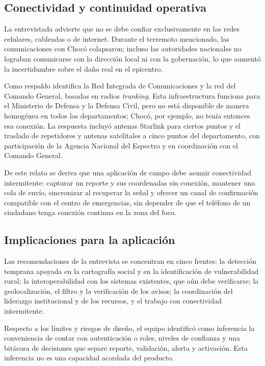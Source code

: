 \subsection{Conectividad y continuidad operativa}

La entrevistada advierte que no se debe confiar exclusivamente en las redes celulares, cableadas o de internet. Durante el terremoto mencionado, las comunicaciones con Chocó colapsaron; incluso las autoridades nacionales no lograban comunicarse con la dirección local ni con la gobernación, lo que aumentó la incertidumbre sobre el daño real en el epicentro.

Como respaldo identifica la Red Integrada de Comunicaciones y la red del Comando General, basadas en radios \emph{trunking}. Esta infraestructura funciona para el Ministerio de Defensa y la Defensa Civil, pero no está disponible de manera homogénea en todos los departamentos; Chocó, por ejemplo, no tenía entonces esa conexión. La respuesta incluyó antenas Starlink para ciertos puntos y el traslado de repetidores y antenas satelitales a cinco puntos del departamento, con participación de la Agencia Nacional del Espectro y en coordinación con el Comando General.

De este relato se deriva que una aplicación de campo debe asumir conectividad intermitente: capturar un reporte y sus coordenadas sin conexión, mantener una cola de envío, sincronizar al recuperar la señal y ofrecer un canal de confirmación compatible con el centro de emergencias, sin depender de que el teléfono de un ciudadano tenga conexión continua en la zona del foco.

\subsection{Implicaciones para la aplicación}

Las recomendaciones de la entrevista se concentran en cinco frentes: la detección temprana apoyada en la cartografía social y en la identificación de vulnerabilidad rural; la interoperabilidad con los sistemas existentes, que aún debe verificarse; la geolocalización, el filtro y la verificación de los avisos; la coordinación del liderazgo institucional y de los recursos, y el trabajo con conectividad intermitente.

Respecto a los límites y riesgos de diseño, el equipo identificó como inferencia la conveniencia de contar con autenticación o roles, niveles de confianza y una bitácora de decisiones que separe reporte, validación, alerta y activación. Esta inferencia no es una capacidad acordada del producto.


